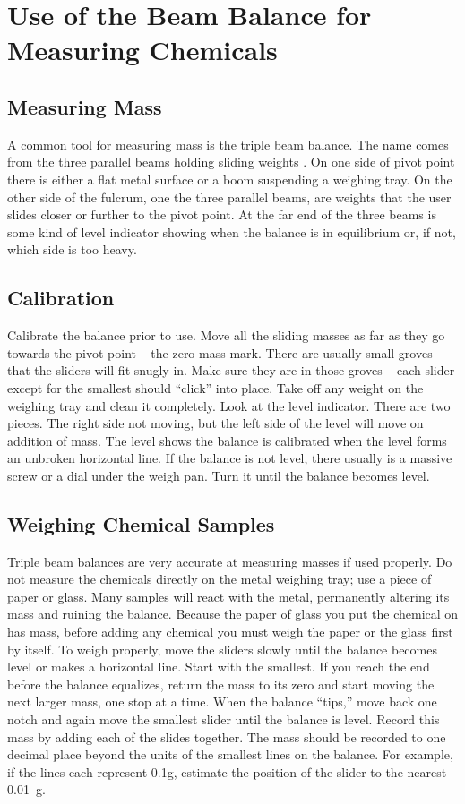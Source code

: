 \chapter{Use of the Beam Balance for Measuring Chemicals}

\section{Measuring Mass}

A common tool for measuring mass is the triple beam balance. The name comes from the three parallel beams holding sliding weights%
. On one side of pivot point there is either a flat metal surface or a boom suspending a weighing tray. On the other side of the fulcrum, one the three parallel beams, are weights that the user slides closer or further to the pivot point. At the far end of the three beams is some kind of level indicator showing when the balance is in equilibrium or, if not, which side is too heavy.

\section{Calibration}

Calibrate the balance prior to use. Move all the sliding masses as far as they go towards the pivot point – the zero mass mark. There are usually small groves that the sliders will fit snugly in. Make sure they are in those groves – each slider except for the smallest should “click” into place. Take off any weight on the weighing tray and clean it completely. Look at the level indicator. There are two pieces. The right side not moving, but the left side of the level will move on addition of mass. The level shows the balance is calibrated when the level forms an unbroken horizontal line. If the balance is not level, there usually is a massive screw or a dial under the weigh pan. Turn it until the balance becomes level.

\section{Weighing Chemical Samples}

Triple beam balances are very accurate at measuring masses if used properly. Do not measure the chemicals directly on the metal weighing tray; use a piece of paper or glass. Many samples will react with the metal, permanently altering its mass and ruining the balance. Because the paper of glass you put the chemical on has mass, before adding any chemical you must weigh the paper or the glass first by itself. To weigh properly, move the sliders slowly until the balance becomes level or makes a horizontal line. Start with the smallest. If you reach the end before the balance equalizes, return the mass to its zero and start moving the next larger mass, one stop at a time. When the balance “tips,” move back one notch and again move the smallest slider until the balance is level. Record this mass by adding each of the slides together. The mass should be recorded to one decimal place beyond the units of the smallest lines on the balance. For example, if the lines each represent 0.1g, estimate the position of the slider to the nearest 0.01~g.

